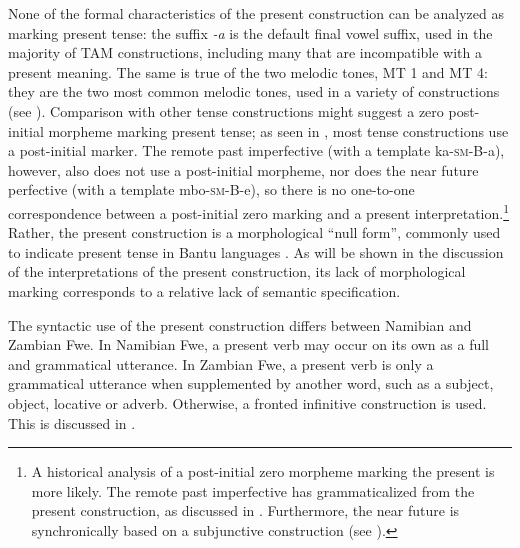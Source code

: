 None of the formal characteristics of the present construction can be analyzed as marking present tense: the suffix \textit{-a} is the default final vowel suffix, used in the majority of TAM constructions, including many that are incompatible with a present meaning. The same is true of the two melodic tones, MT 1 and MT 4: they are the two most common melodic tones, used in a variety of constructions (see ). Comparison with other tense constructions might suggest a zero post-initial morpheme marking present tense; as seen in , most tense constructions use a post-initial marker. The remote past imperfective (with a template ka-\textsc{sm}-B-a), however, also does not use a post-initial morpheme, nor does the near future perfective (with a template mbo-\textsc{sm}-B-e), so there is no one-to-one correspondence between a post-initial zero marking and a present interpretation.\footnote{A historical analysis of a post-initial zero morpheme marking the present is more likely. The remote past imperfective has grammaticalized from the present construction, as discussed in . Furthermore, the near future is synchronically based on a subjunctive construction (see ).} Rather, the present construction is a morphological “null form”, commonly used to indicate present tense in Bantu languages \citep[117]{Nurse2008}. As will be shown in the discussion of the interpretations of the present construction, its lack of morphological marking corresponds to a relative lack of semantic specification.

The syntactic use of the present construction differs between Namibian and Zambian Fwe. In Namibian Fwe, a present verb may occur on its own as a full and grammatical utterance. In Zambian Fwe, a present verb is only a grammatical utterance when supplemented by another word, such as a subject, object, locative or adverb. Otherwise, a fronted infinitive construction is used. This is discussed in .

